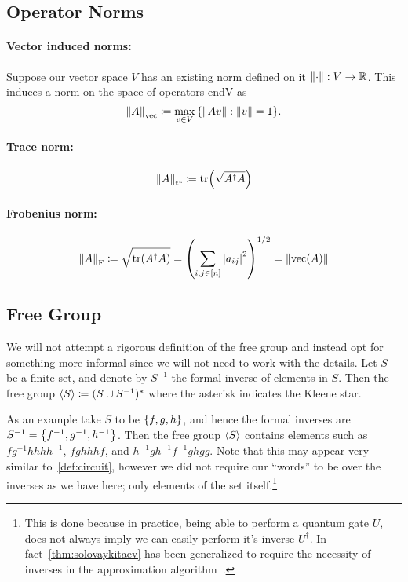 \subsection{Operator Norms}

\paragraph{Vector induced norms:}
Suppose our vector space $V$ has an existing norm defined on it $\norm{\cdot}: V \to \mathbb{R}$.
This induces a norm on the space of operators \gls{endV} as
\begin{equation}
    \norm{A}_\text{vec} \coloneqq \max_{v \in V}\qty{\norm{A v}: \norm{v} = 1}.
\end{equation}

\paragraph{Trace norm:}
\begin{equation}
    \norm{A}_\text{tr} \coloneqq \tr(\sqrt{A^\dagger A})
\end{equation}

\paragraph{Frobenius norm:}
\begin{equation}
    \norm{A}_\text{F} \coloneqq \sqrt{\tr(A^\dagger A)} = \qty(\sum_{i, j \in [n]}\abs{a_{ij}}^2)^{1/2} = \norm{\operatorname{vec}(A)}
\end{equation}


\subsection{Free Group}
We will not attempt a rigorous definition of the free group and instead opt for something more informal since we will not need to work with the details.
Let $S$ be a finite set, and denote by $S^{-1}$ the formal inverse of elements in $S$.
Then the free group $\expval{S} \coloneqq (S\cup S^{-1})^*$ where the asterisk indicates the Kleene star.

As an example take $S$ to be $\qty{f, g, h}$, and hence the formal inverses are $S^{-1} = \qty{f^{-1}, g^{-1}, h^{-1}}$.
Then the free group $\expval{S}$ contains elements such as $fg^{-1}hhhh^{-1}$, $fghhhf$, and $h^{-1}gh^{-1}f^{-1}ghgg$.
Note that this may appear very similar to~\cref{def:circuit}, however we did not require our ``words'' to be over the inverses as we have here; only elements of the set itself.\footnote{This is done because in practice, being able to perform a quantum gate $U$, does not always imply we can easily perform it's inverse $U^\dagger$. In fact~\cref{thm:solovaykitaev} has been generalized to require the necessity of inverses in the approximation algorithm~\cite{inverse-free-sk}.} %

